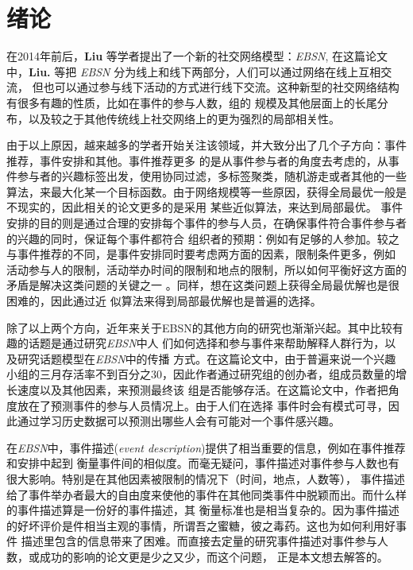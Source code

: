 \section{绪论} 
\par{
    在2014年前后，\textbf{Liu} 等学者提出了一个新的社交网络模型：\textit{EBSN}\cite{EBSN_linking},
在这篇论文中，\textbf{Liu.} 等把 \textit{EBSN} 分为线上和线下两部分，人们可以通过网络在线上互相交流，
但也可以通过参与线下活动的方式进行线下交流。这种新型的社交网络结构有很多有趣的性质，比如在事件的参与人数，组的
规模及其他层面上的长尾分布，以及较之于其他传统线上社交网络上的更为强烈的局部相关性。
}

\par{
    由于以上原因，越来越多的学者开始关注该领域，并大致分出了几个子方向：事件推荐，事件安排和其他。事件推荐更多
    的是从事件参与者的角度去考虑的，从事件参与者的兴趣标签出发，使用协同过滤，多标签聚类，随机游走或者其他的一些
    算法，来最大化某一个目标函数。由于网络规模等一些原因，获得全局最优一般是不现实的，因此相关的论文更多的是采用
    某些近似算法，来达到局部最优\cite{EBSN_event_reco}\cite{EBSN_on_social}\cite{EBSN_event_recom2}。
    事件安排的目的则是通过合理的安排每个事件的参与人员，在确保事件符合事件参与者的兴趣的同时，保证每个事件都符合
    组织者的预期：例如有足够的人参加。较之与事件推荐的不同，是事件安排同时要考虑两方面的因素，限制条件更多，例如
    活动参与人的限制，活动举办时间的限制和地点的限制，所以如何平衡好这方面的矛盾是解决这类问题的关键之一\cite{EBSN_conflict-aware_2016}
    \cite{EBSN_feedback-aware_2017}\cite{EBSN_conflict-aware_2015}。同样，想在这类问题上获得全局最优解也是很困难的，因此通过近
    似算法来得到局部最优解也是普遍的选择。
}
\par{
    除了以上两个方向，近年来关于EBSN的其他方向的研究也渐渐兴起。其中比较有趣的话题是通过研究\textit{EBSN}中人
    们如何选择和参与事件来帮助解释人群行为\cite{EBSN_understanding}，以及研究话题模型在\textit{EBSN}中的传播
    方式。在\cite{EBSN_can_i}这篇论文中，由于普遍来说一个兴趣小组的三月存活率不到百分之30，因此作者通过研究组的创办者，组成员数量的增长速度以及其他因素，来预测最终该
    组是否能够存活。在\cite{EBSN_who_will}这篇论文中，作者把角度放在了预测事件的参与人员情况上。由于人们在选择
    事件时会有模式可寻，因此通过学习历史数据可以预测出哪些人会有可能对一个事件感兴趣。
}
\par{
    在\textit{EBSN}中，事件描述(\textit{event description})提供了相当重要的信息，例如在事件推荐和安排中起到
    衡量事件间的相似度。而毫无疑问，事件描述对事件参与人数也有很大影响。特别是在其他因素被限制的情况下（时间，地点，人数等），
    事件描述给了事件举办者最大的自由度来使他的事件在其他同类事件中脱颖而出。而什么样的事件描述算是一份好的事件描述，其
    衡量标准也是相当复杂的。因为事件描述的好坏评价是件相当主观的事情，所谓吾之蜜糖，彼之毒药。这也为如何利用好事件
    描述里包含的信息带来了困难。而直接去定量的研究事件描述对事件参与人数，或成功的影响的论文更是少之又少，而这个问题，
    正是本文想去解答的。
}
